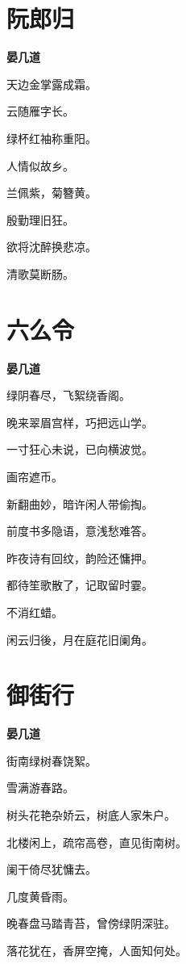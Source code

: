 \documentclass[12pt,a4paper]{ctexbook}
\begin{document}
\section{阮郎归}
\textbf{晏几道}\par\vspace{0.5em}
天边金掌露成霜。\par
云随雁字长。\par
绿杯红袖称重阳。\par
人情似故乡。\par
兰佩紫，菊簪黄。\par
殷勤理旧狂。\par
欲将沈醉换悲凉。\par
清歌莫断肠。\par

\section{六么令}
\textbf{晏几道}\par\vspace{0.5em}
绿阴春尽，飞絮绕香阁。\par
晚来翠眉宫样，巧把远山学。\par
一寸狂心未说，已向横波觉。\par
画帘遮币。\par
新翻曲妙，暗许闲人带偷掏。\par
前度书多隐语，意浅愁难答。\par
昨夜诗有回纹，韵险还慵押。\par
都待笙歌散了，记取留时霎。\par
不消红蜡。\par
闲云归後，月在庭花旧阑角。\par

\section{御街行}
\textbf{晏几道}\par\vspace{0.5em}
街南绿树春饶絮。\par
雪满游春路。\par
树头花艳杂娇云，树底人家朱户。\par
北楼闲上，疏帘高卷，直见街南树。\par
阑干倚尽犹慵去。\par
几度黄昏雨。\par
晚春盘马踏青苔，曾傍绿阴深驻。\par
落花犹在，香屏空掩，人面知何处。\par
\end{document}
